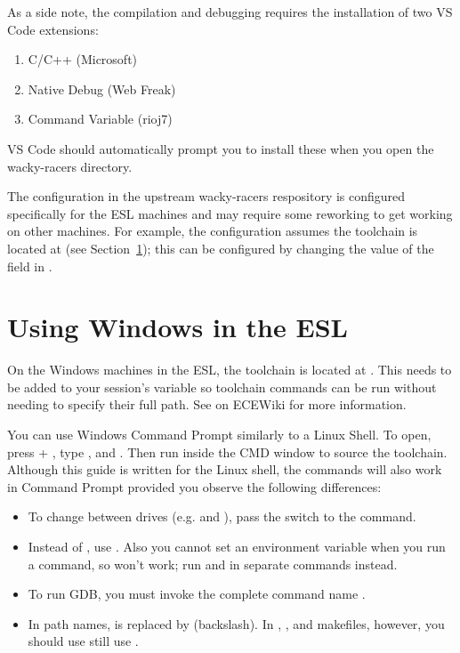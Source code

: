 As a side note, the compilation and debugging requires the
installation of two VS Code extensions:
%
\begin{enumerate}
\item C/C++ (Microsoft)
\item Native Debug (Web Freak)
\item Command Variable (rioj7)
\end{enumerate}
%
VS Code should automatically prompt you to install these when you open
  the wacky-racers directory.

The  configuration in the upstream wacky-racers
respository is configured specifically for the ESL machines and may
require some reworking to get working on other machines. For example,
the configuration assumes the toolchain is located at
 (see Section~\ref{esl-windows}); this
can be configured by changing the value of the
 field in .

\section{Using Windows in the ESL} \label{esl-windows}

On the Windows machines in the ESL, the toolchain is located at
. This needs to be added to your session's
 variable so toolchain commands can be run without needing to
specify their full path. See
 on ECEWiki for more
information.

You can use Windows Command Prompt similarly to a Linux Shell. To open, press
 + , type , and . Then run
 inside the CMD
window to source the toolchain. Although this guide is written for the Linux
shell, the commands will also work in Command Prompt provided you observe the
following differences:
\begin{itemize}
\item To change between drives (e.g.  and ), pass the
 switch to the  command.
\item Instead of , use .
Also you cannot set an environment variable when you run a command, so
 won't work; run  and  in
separate commands instead.
\item To run GDB, you must invoke the complete command name
.
\item In path names, \file{/} is replaced by \file{\textbackslash}
(backslash). In , , and makefiles, however, you should use
still use \file{/}.
\end{itemize}
